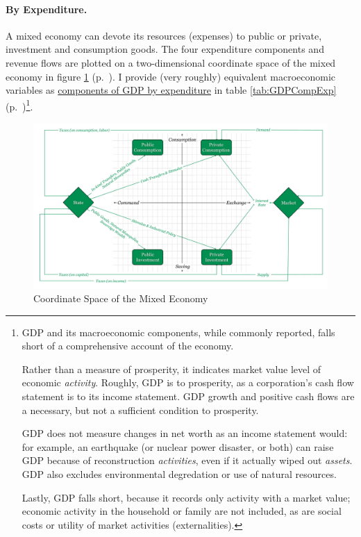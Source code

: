 \paragraph[By Expenditure]{By Expenditure.}  \label{sec:byexpenditure}
A mixed economy can devote its resources (expenses) to public or private, investment and consumption goods. The four expenditure components and revenue flows are plotted on a two-dimensional coordinate space of the mixed economy in figure \ref{fig:coordinate-space} (p.~\pageref{fig:coordinate-space}). I provide (very roughly) equivalent macroeconomic variables as \hyperref[tab:GDPCompExp]{components of GDP by expenditure} in table \ref{tab:GDPCompExp} (p.~\pageref{tab:GDPCompExp})\footnote{
	\gls{GDP} and its macroeconomic components, while commonly reported, falls short of a comprehensive account of the economy. 
	
	Rather than a measure of prosperity, it indicates market value level of economic \emph{activity}. Roughly, \gls{GDP} is to prosperity, as a corporation's cash flow statement is to its income statement. \gls{GDP} growth and positive cash flows are a necessary, but not a sufficient condition to prosperity. 
	
	\gls{GDP} does not measure changes in net worth as an income statement would: for example, an earthquake (or nuclear power disaster, or both) can raise \gls{GDP} because of reconstruction \emph{activities}, even if it actually wiped out \emph{assets}. \gls{GDP} also excludes environmental degredation or use of natural resources.
	
	Lastly, \gls{GDP} falls short, because it records only activity with a market value; economic activity in the household or family are not included, as are social costs or utility of market activities (externalities).}.
	
\begin{landscape}
 \begin{figure}[htbp]
	\centering
	\includegraphics[width=1\linewidth]{./img/coordinate-space}  
	\caption{Coordinate Space of the Mixed Economy}
	\label{fig:coordinate-space}
\end{figure} %
\end{landscape}

